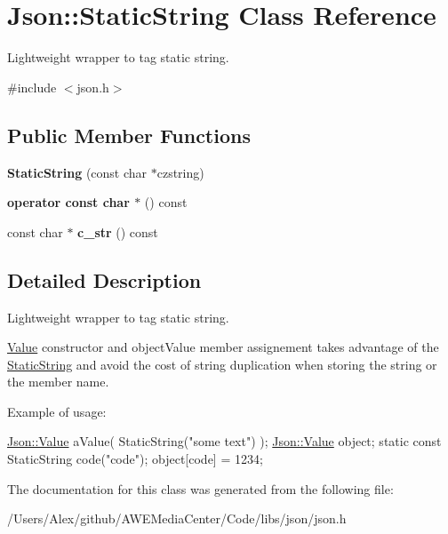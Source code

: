\hypertarget{class_json_1_1_static_string}{\section{Json\-:\-:Static\-String Class Reference}
\label{class_json_1_1_static_string}
}


Lightweight wrapper to tag static string.  




{\ttfamily \#include $<$json.\-h$>$}

\subsection*{Public Member Functions}
\begin{DoxyCompactItemize}
\item 
\hypertarget{class_json_1_1_static_string_afb6baf1ec078ce76f0b0f9b39d19437f}{{\bfseries Static\-String} (const char $\ast$czstring)}\label{class_json_1_1_static_string_afb6baf1ec078ce76f0b0f9b39d19437f}

\item 
\hypertarget{class_json_1_1_static_string_ac2b334d46bbea4c0227e508fc66433e9}{{\bfseries operator const char $\ast$} () const }\label{class_json_1_1_static_string_ac2b334d46bbea4c0227e508fc66433e9}

\item 
\hypertarget{class_json_1_1_static_string_ab86fc6a3183adf12fdba4b370acf1754}{const char $\ast$ {\bfseries c\-\_\-str} () const }\label{class_json_1_1_static_string_ab86fc6a3183adf12fdba4b370acf1754}

\end{DoxyCompactItemize}


\subsection{Detailed Description}
Lightweight wrapper to tag static string. 

\hyperlink{class_json_1_1_value}{Value} constructor and object\-Value member assignement takes advantage of the \hyperlink{class_json_1_1_static_string}{Static\-String} and avoid the cost of string duplication when storing the string or the member name.

Example of usage\-: 
\begin{DoxyCode}
\hyperlink{class_json_1_1_value}{Json::Value} aValue( StaticString(\textcolor{stringliteral}{"some text"}) );
\hyperlink{class_json_1_1_value}{Json::Value} object;
\textcolor{keyword}{static} \textcolor{keyword}{const} StaticString code(\textcolor{stringliteral}{"code"});
\textcolor{keywordtype}{object}[code] = 1234;
\end{DoxyCode}
 

The documentation for this class was generated from the following file\-:\begin{DoxyCompactItemize}
\item 
/\-Users/\-Alex/github/\-A\-W\-E\-Media\-Center/\-Code/libs/json/json.\-h\end{DoxyCompactItemize}
